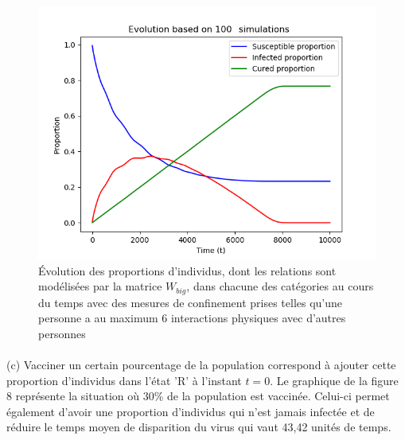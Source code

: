 \documentclass[a4paper, 12pt, oneside]{article}
\begin{document}
\begin{figure}[H]
	\centering
	\includegraphics[scale=1]{Wbig_dense_containment.png} 
	\caption{Évolution des proportions d'individus, dont les relations sont modélisées par la matrice $W_{big}$, dans chacune des catégories au cours du temps avec des mesures de confinement prises telles qu'une personne a au maximum 6 interactions physiques avec d'autres personnes}
\end{figure}

\paragraph{}(c) Vacciner un certain pourcentage de la population correspond à ajouter cette proportion d'individus dans l'état 'R' à l'instant $t = 0$. Le graphique de la figure 8 représente la situation où 30\% de la population est vaccinée. Celui-ci permet également d'avoir une proportion d'individus qui n'est jamais infectée et de réduire le temps moyen de disparition du virus qui vaut 43,42 unités de temps.
\end{document}
